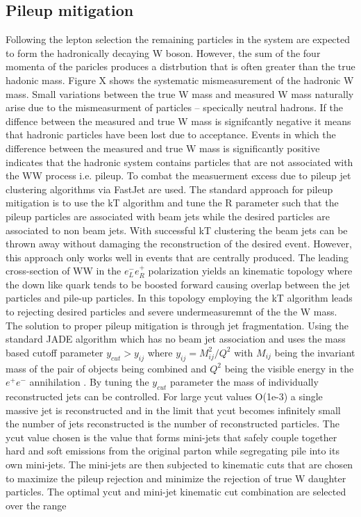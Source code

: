 \subsection{Pileup mitigation}
\label{subsec:Pileup_mitigation}
Following the lepton selection the remaining particles in the system are expected to form the hadronically decaying W boson. However, the sum of the four momenta of the paricles  produces a distrbution that is often greater than the true hadonic mass. Figure X shows the systematic mismeasurement of the hadronic W mass. Small variations between the true W mass and measured W mass naturally arise due to the mismeasurment of particles -- specically neutral hadrons. If the diffence between the measured and true W mass is signifcantly negative it means that hadronic particles have been lost due to acceptance.  Events in which the difference between the measured and true W mass is significantly positive indicates that the hadronic system contains particles that are not associated with the WW process i.e. pileup.   To combat the measuerment excess due to pileup jet clustering algorithms via FastJet\cite{fastjet} are used.  The standard approach for pileup mitigation is to use the kT algorithm\cite{kt} and tune the R parameter such that the pileup particles are associated with beam jets while the desired particles are associated to non beam jets. With successful kT clustering the beam jets can be thrown away without damaging the reconstruction of the desired event. However, this approach only works well in events that are centrally produced.  The leading cross-section of WW in the $e^{-}_L e^{+}_R$ polarization yields an kinematic topology where the down like quark tends to be boosted forward causing overlap between the jet particles and pile-up particles. In this topology employing the kT algorithm leads to rejecting desired particles and severe undermeasuremnt of the the W mass. The solution to proper pileup mitigation is through jet fragmentation.   Using the standard JADE algorithm which has no beam jet association and uses the mass based cutoff parameter $y_{cut} > y_{ij}$ where $y_{ij} = M_{ij}^2 / Q^2$ with $M_{ij}$ being the invariant mass of the pair of objects being combined and $Q^2$ being the visible energy in the $e^{+}e^{-}$ annihilation \cite{ycut}. By tuning the $y_{cut}$ parameter the mass of individually reconstructed jets can be controlled. For large ycut values O(1e-3) a single massive jet is reconstructed and in the limit that ycut becomes infinitely small the number of jets reconstructed is the number of reconstructed particles.  The ycut value  chosen is the value that forms mini-jets that safely couple together hard and soft emissions from  the original parton while segregating pile into its own mini-jets. The mini-jets are then subjected to kinematic cuts that are chosen to maximize the pileup rejection and minimize the rejection of true W daughter particles. The optimal ycut and mini-jet kinematic cut combination are selected over the range
